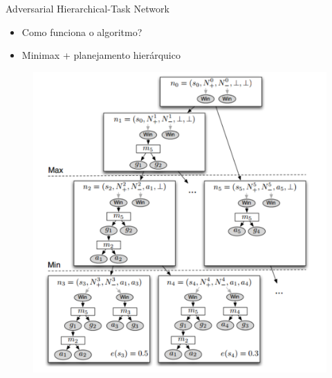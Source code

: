 \documentclass{beamer}
\begin{document}
\begin{frame}{Adversarial Hierarchical-Task Network}
	\begin{itemize}
		\item Como funciona o algoritmo?
		\item Minimax + planejamento hierárquico
	\end{itemize}
	
	\begin{figure}[here]
		\includegraphics[width=0.4\linewidth]{fig/ahtn.pdf}	
	\end{figure}	
\end{frame}
\end{document}
